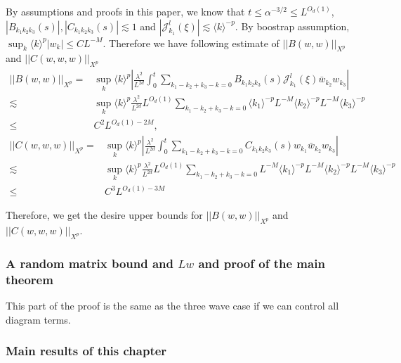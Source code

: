 By assumptions and proofs in this paper, we know that $t\le \alpha^{-3/2}\le L^{O_d(1)}$, $|B_{k_1k_2k_3}(s)|, |C_{k_1k_2k_3}(s)|\lesssim 1$ and $|\mathcal{J}^{l}_{k_1}(\xi)|\lesssim \langle k\rangle^{-p}$. By boostrap assumption, $\sup_{k} \langle k\rangle^{p} |w_k|\le CL^{-M}$. Therefore we have following estimate of $||B(w,w)||_{X^p}$ and $||C(w,w,w)||_{X^p}$
\begin{equation}
\begin{split}
 ||B(w,w)||_{X^p}=&\sup_{k} \langle k\rangle^{p} \left|\frac{\lambda^2}{L^{2d}} \int^{t}_0\sum_{k_1-k_2+k_3-k=0} B_{k_1k_2k_3}(s) \mathcal{J}^{l}_{k_1}(\xi)\bar{w}_{k_2}w_{k_3}\right| 
 \\
 \lesssim& \sup_{k} \langle k\rangle^{p} \frac{\lambda^2}{L^{2d}} L^{O_d(1)} \sum_{k_1-k_2+k_3-k=0} \langle k_1\rangle^{-p} L^{-M}\langle k_2\rangle^{-p} L^{-M}\langle k_3\rangle^{-p}
 \\
 \le& C^2 L^{O_d(1)-2M},
\end{split}
\end{equation}
\begin{equation}
\begin{split}
 ||C(w,w,w)||_{X^p}=&\sup_{k} \langle k\rangle^{p} \left|\frac{\lambda^2}{L^{2d}} \int^{t}_0\sum_{k_1-k_2+k_3-k=0} C_{k_1k_2k_3}(s) w_{k_1}\bar{w}_{k_2}w_{k_3}\right|
 \\
 \lesssim& \sup_{k} \langle k\rangle^{p} \frac{\lambda^2}{L^{2d}} L^{O_d(1)} \sum_{k_1-k_2+k_3-k=0} L^{-M}\langle k_1\rangle^{-p} L^{-M}\langle k_2\rangle^{-p} L^{-M}\langle k_3\rangle^{-p}
 \\
 \le& C^3 L^{O_d(1)-3M}
\end{split}
\end{equation}

Therefore, we get the desire upper bounds for $||B(w,w)||_{X^p}$ and $||C(w,w,w)||_{X^p}$.

\subsubsection{A random matrix bound and $Lw$ and proof of the main theorem}\label{sec.randmatintro.fourwave} This part of the proof is the same as the three wave case if we can control all diagram terms.






\subsubsection{Main results of this chapter}


